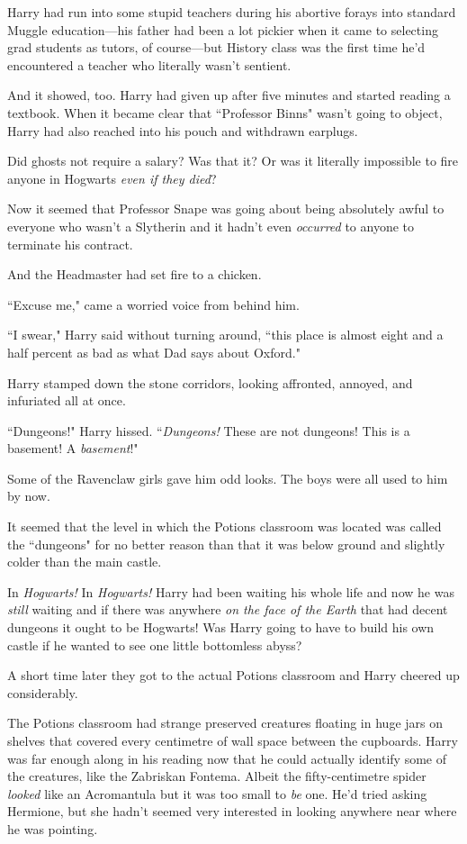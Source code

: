 Harry had run into some stupid teachers during his abortive forays into standard Muggle education—his father had been a lot pickier when it came to selecting grad students as tutors, of course—but History class was the first time he'd encountered a teacher who literally wasn't sentient.

And it showed, too. Harry had given up after five minutes and started reading a textbook. When it became clear that ``Professor Binns" wasn't going to object, Harry had also reached into his pouch and withdrawn earplugs.

Did ghosts not require a salary? Was that it? Or was it literally impossible to fire anyone in Hogwarts \emph{even if they died}?

Now it seemed that Professor Snape was going about being absolutely awful to everyone who wasn't a Slytherin and it hadn't even \emph{occurred} to anyone to terminate his contract.

And the Headmaster had set fire to a chicken.

``Excuse me," came a worried voice from behind him.

``I swear," Harry said without turning around, ``this place is almost eight and a half percent as bad as what Dad says about Oxford."

\later

Harry stamped down the stone corridors, looking affronted, annoyed, and infuriated all at once.

``Dungeons!" Harry hissed. ``\emph{Dungeons!} These are not dungeons! This is a basement! A \emph{basement}!"

Some of the Ravenclaw girls gave him odd looks. The boys were all used to him by now.

It seemed that the level in which the Potions classroom was located was called the ``dungeons" for no better reason than that it was below ground and slightly colder than the main castle.

In \emph{Hogwarts!} In \emph{Hogwarts!} Harry had been waiting his whole life and now he was \emph{still} waiting and if there was anywhere \emph{on the face of the Earth} that had decent dungeons it ought to be Hogwarts! Was Harry going to have to build his own castle if he wanted to see one little bottomless abyss?

A short time later they got to the actual Potions classroom and Harry cheered up considerably.

The Potions classroom had strange preserved creatures floating in huge jars on shelves that covered every centimetre of wall space between the cupboards. Harry was far enough along in his reading now that he could actually identify some of the creatures, like the Zabriskan Fontema. Albeit the fifty-centimetre spider \emph{looked} like an Acromantula but it was too small to \emph{be} one. He'd tried asking Hermione, but she hadn't seemed very interested in looking anywhere near where he was pointing.

